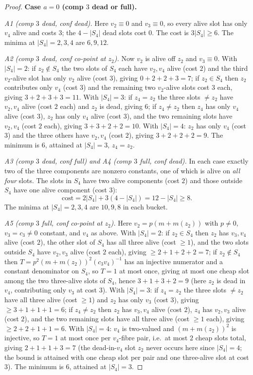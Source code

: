 \documentclass[11pt]{article}
\theoremstyle{plain}
\theoremstyle{definition}
\theoremstyle{remark}
\begin{document}
\begin{proof}
\medskip
\noindent\textbf{Case $a=0$ (comp $3$ dead or full).}

\smallskip
\noindent\emph{A1 (comp $3$ dead, conf dead).}
Here $v_2\equiv 0$ and $v_3\equiv 0$, so every alive slot has only $v_4$ alive and costs
$3$; the $4-|S_4|$ dead slots cost $0$. The cost is $3|S_4|\ge 6$. The minima at
$|S_4|=2,3,4$ are $6,9,12$.

\smallskip
\noindent\emph{A2 (comp $3$ dead, conf co-point at $z_2$).}
Now $v_2$ is alive off $z_2$ and $v_3\equiv 0$. With $|S_4|=2$: if $z_2\notin S_4$ the two
slots of $S_4$ each have $v_2,v_4$ alive (cost $2$) and the third $v_2$-alive slot has only
$v_2$ alive (cost $3$), giving $0+2+2+3=7$; if $z_2\in S_4$ then $z_2$ contributes only
$v_4$ (cost $3$) and the remaining two $v_2$-alive slots cost $3$ each, giving
$3+2+3+3=11$. With $|S_4|=3$: if $z_4=z_2$ the three slots $\ne z_2$ have $v_2,v_4$ alive
(cost $2$ each) and $z_2$ is dead, giving $6$; if $z_4\ne z_2$ then $z_4$ has only $v_4$
alive (cost $3$), $z_2$ has only $v_4$ alive (cost $3$), and the two remaining slots have
$v_2,v_4$ (cost $2$ each), giving $3+3+2+2=10$. With $|S_4|=4$: $z_2$ has only $v_4$
(cost $3$) and the three others have $v_2,v_4$ (cost $2$), giving $3+2+2+2=9$. The minimum
is $6$, attained at $|S_4|=3$, $z_4=z_2$.

\smallskip
\noindent\emph{A3 (comp $3$ dead, conf full) and A4 (comp $3$ full, conf dead).}
In each case exactly two of the three components are nonzero constants, one of which is
alive on \emph{all four} slots. The slots in $S_4$ have two alive components (cost $2$) and
those outside $S_4$ have one alive component (cost $3$):
\[
  \text{cost}=2|S_4|+3(4-|S_4|)=12-|S_4|\ge 8 .
\]
The minima at $|S_4|=2,3,4$ are $10,9,8$ in each bucket.

\smallskip
\noindent\emph{A5 (comp $3$ full, conf co-point at $z_2$).}
Here $v_2=p(m+m(z_2))$ with $p\ne 0$, $v_3=c_3\ne 0$ constant, and $v_4$ as above.
With $|S_4|=2$: if $z_2\in S_4$ then $z_2$ has $v_3,v_4$ alive (cost $2$), the other slot of
$S_4$ has all three alive (cost $\ge 1$), and the two slots outside $S_4$ have $v_2,v_3$
alive (cost $2$ each), giving $\ge 2+1+2+2=7$; if $z_2\notin S_4$ then
$T=p^2(m+m(z_2))^2(c_3v_4)^{-1}$ has an injective numerator and a constant denominator on
$S_4$, so $T=1$ at most once, giving at most one cheap slot among the two three-alive slots
of $S_4$, hence $3+1+3+2=9$ (here $z_2$ is dead in $v_4$, contributing only $v_3$ at cost
$3$). With $|S_4|=3$: if $z_4=z_2$ the three slots $\ne z_2$ have all three alive
(cost $\ge 1$) and $z_2$ has only $v_3$ (cost $3$), giving $\ge 3+1+1+1=6$; if $z_4\ne z_2$
then $z_2$ has $v_3,v_4$ alive (cost $2$), $z_4$ has $v_2,v_3$ alive (cost $2$), and the two
remaining slots have all three alive (cost $\ge 1$ each), giving $\ge 2+2+1+1=6$.
With $|S_4|=4$: $v_4$ is two-valued and $(m+m(z_2))^2$ is injective, so $T=1$ at most once
per $v_4$-fibre pair, i.e.\ at most $2$ cheap slots total, giving $2+1+1+3=7$ (the dead-in-$v_4$
slot $z_2$ never occurs here since $|S_4|=4$; the bound is attained with one cheap slot per
pair and one three-alive slot at cost $3$). The minimum is $6$, attained at $|S_4|=3$.


\end{proof}
\end{document}
